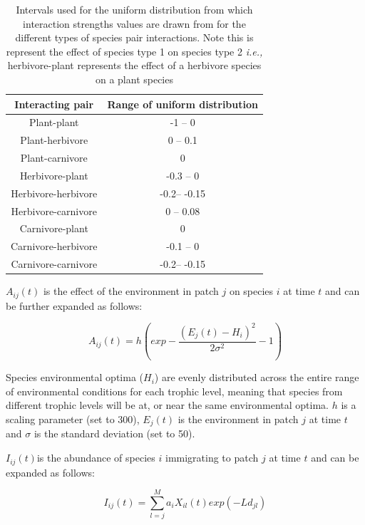\begin{table}[h!]
\centering
\begin{tabular}{||c c||} 
 \hline
Interacting pair & Range of uniform distribution \\ [0.5ex] \hline\hline
 Plant-plant & -1 -- 0 \\ 
 Plant-herbivore & 0 -- 0.1 \\
 Plant-carnivore & 0 \\
 Herbivore-plant & -0.3 -- 0 \\
 Herbivore-herbivore & -0.2-- -0.15 \\
 Herbivore-carnivore & 0 -- 0.08 \\
 Carnivore-plant & 0  \\
 Carnivore-herbivore & -0.1 -- 0  \\
 Carnivore-carnivore & -0.2-- -0.15 \\ [1ex] 
 \hline
\end{tabular}
\caption{Intervals used for the uniform distribution from which interaction
strengths values are drawn from for the different types of species pair
interactions. Note this is represent the effect of species type 1 on species
type 2 \emph{i.e.,} herbivore-plant represents the effect of a herbivore species on a plant species}
\label{table:interaction_strength}
\end{table}

$A_{ij}(t)$ is the effect of the environment in patch $j$ on species $i$ at time $t$ and can be further expanded as follows:  

\begin{equation} \label{eq:metacomm_env}
A_{ij}(t)=h\left(exp-\frac{(E_{j}(t)-H_{i})^2}{2\sigma^2}-1\right)
\end{equation}

Species environmental optima ($H_i$) are evenly distributed across the entire range of environmental conditions for each trophic level, meaning that species from different trophic levels will be at, or near the same environmental optima. $h$ is a scaling parameter (set to 300), $E_j(t)$ is the environment in patch $j$ at time $t$ and $\sigma$ is the standard deviation (set to 50).

$I_{ij}(t) $is the abundance of species $i$ immigrating to patch $j$ at time $t$
and can be expanded as follows:

\begin{equation} \label{eq:metacomm_imm}
I_{ij}(t)=\sum_{l=j}^{M}a_iX_{il}(t)exp(-Ld_{jl})
\end{equation}

